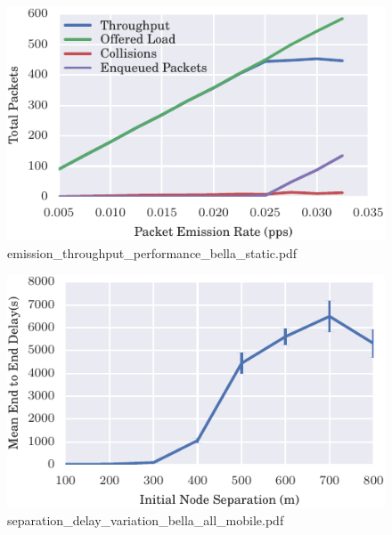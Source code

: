 \documentclass{article}
\begin{document}
\begin{figure}[h!]
\centering
\includegraphics[width=\linewidth]{emission_throughput_performance_bella_static.pdf}
\caption{emission\_throughput\_performance\_bella\_static.pdf}
\end{figure}




\begin{figure}[h!]
\centering
\includegraphics[width=\linewidth]{separation_delay_variation_bella_all_mobile.pdf}
\caption{separation\_delay\_variation\_bella\_all\_mobile.pdf}
\end{figure}
\end{document}
